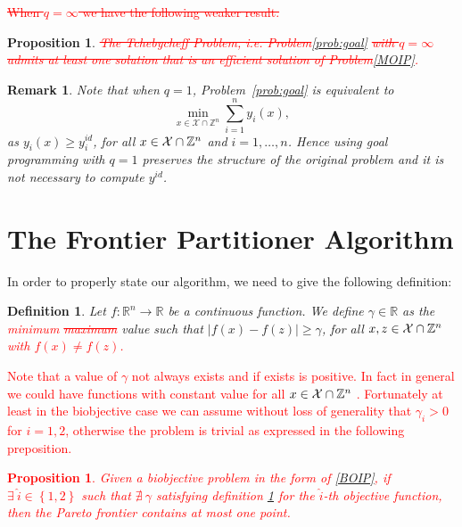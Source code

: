 \documentclass[preprint,12pt]{elsarticle}
\newcommand{\red}[1]{\textcolor{red}{#1}}
\newtheorem{proposition}[theorem]{Proposition}
\newtheorem{definition}[theorem]{Definition}
\newtheorem{remark}[theorem]{Remark}
\def\X{{\cal X}}
\def\R{\mathbb{R}}
\def\Z{\mathbb{Z}}
\begin{document}
\red{\st{When $q=\infty$ we have the following weaker result.}}
\begin{proposition}\label{prop:Tcheb}
\red{\st{The Tchebycheff Problem, i.e. Problem}\eqref{prob:goal} \st{with $q = \infty$ admits at least one solution that is an efficient solution of Problem}\eqref{MOIP}.}
\end{proposition}

\begin{remark}\label{rem:q1}
Note that when $q=1$, Problem~\eqref{prob:goal} is equivalent to
\[
\min_{x\in \mathcal{X}\cap \Z^n} \sum_{i=1}^n y_i(x),
\]
as $y_i(x)\geq y_i^{id}$, for all $x\in \X\cap \Z^n$ and $i=1,\ldots,n$. Hence using goal programming with $q=1$ preserves the structure of the original problem and it is not necessary to compute $y^{id}$.
\end{remark}



\section{The Frontier Partitioner Algorithm}\label{sec:FPA}
In order to properly state our algorithm, we need to give the following definition:
%
\begin{definition}\label{def:gammah}
Let $f:\R^n \rightarrow \R$ be a continuous function.
We define  $\gamma \in \R$  as the \red{minimum \st{ maximum}} value such that $| f(x) - f(z) | \ge \gamma$, for all $x,z \in \X\cap \Z^n$ \red{ with $f(x) \neq f(z)$.}
\end{definition}

\red{Note that a value of $\gamma$ not always exists and if exists is positive. In fact in general we could have functions with constant value for all $x \in \X\cap \Z^n$ . Fortunately at least in the biobjective case we can assume without loss of generality that $\gamma_i > 0$ for $ i = 1,2$, otherwise the problem is trivial as expressed in the following preposition.}
\red{\begin{proposition}\label{proof:gamma0}
 Given a biobjective problem in the form of \eqref{BOIP}, if $\exists\  \hat{i} \in \left\{ 1, 2 \right\}$ such that $\nexists\  \gamma$ satisfying definition \ref{def:gammah} for the $\hat{i}$-th objective function, then the Pareto frontier contains at most one point.
\end{proposition}  }
\end{document}

